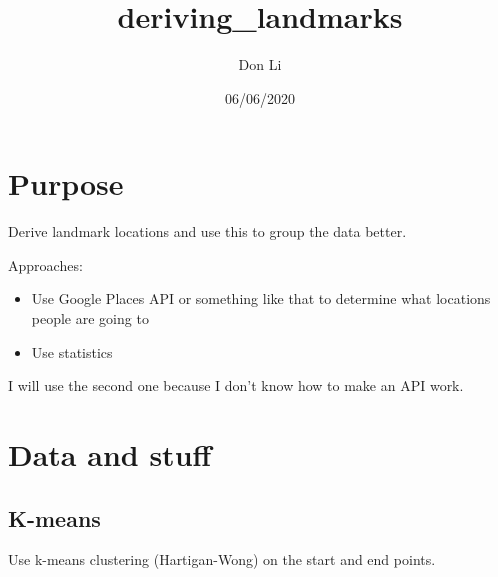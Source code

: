 \documentclass[]{article}
\title{deriving\_landmarks}
\author{Don Li}
\date{06/06/2020}
\providecommand{\tightlist}{%
  \setlength{\itemsep}{0pt}\setlength{\parskip}{0pt}}
\begin{document}
\maketitle

\hypertarget{purpose}{%
\section{Purpose}\label{purpose}}

Derive landmark locations and use this to group the data better.

Approaches:

\begin{itemize}
\tightlist
\item
  Use Google Places API or something like that to determine what
  locations people are going to
\item
  Use statistics
\end{itemize}

I will use the second one because I don't know how to make an API work.

\hypertarget{data-and-stuff}{%
\section{Data and stuff}\label{data-and-stuff}}

\hypertarget{k-means}{%
\subsection{K-means}\label{k-means}}

Use k-means clustering (Hartigan-Wong) on the start and end points.
\end{document}
